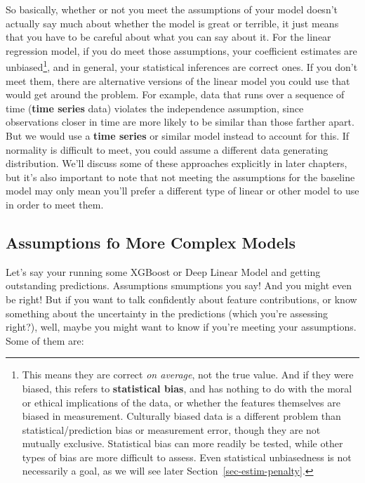 \documentclass[
  letterpaper,
]{krantz}
\begin{document}
So basically, whether or not you meet the assumptions of your model
doesn't actually say much about whether the model is great or terrible,
it just means that you have to be careful about what you can say about
it. For the linear regression model, if you do meet those assumptions,
your coefficient estimates are unbiased\footnote{This means they are
  correct \emph{on average}, not the true value. And if they were
  biased, this refers to \textbf{statistical bias}, and has nothing to
  do with the moral or ethical implications of the data, or whether the
  features themselves are biased in measurement. Culturally biased data
  is a different problem than statistical/prediction bias or measurement
  error, though they are not mutually exclusive. Statistical bias can
  more readily be tested, while other types of bias are more difficult
  to assess. Even statistical unbiasedness is not necessarily a goal, as
  we will see later Section~\ref{sec-estim-penalty}.}, and in general,
your statistical inferences are correct ones. If you don't meet them,
there are alternative versions of the linear model you could use that
would get around the problem. For example, data that runs over a
sequence of time (\textbf{time series} data) violates the independence
assumption, since observations closer in time are more likely to be
similar than those farther apart. But we would use a \textbf{time
series} or similar model instead to account for this. If normality is
difficult to meet, you could assume a different data generating
distribution. We'll discuss some of these approaches explicitly in later
chapters, but it's also important to note that not meeting the
assumptions for the baseline model may only mean you'll prefer a
different type of linear or other model to use in order to meet them.

\subsection{Assumptions fo More Complex
Models}\label{sec-lm-assumption-complex}

Let's say your running some XGBoost or Deep Linear Model and getting
outstanding predictions. Assumptions smumptions you say! And you might
even be right! But if you want to talk confidently about feature
contributions, or know something about the uncertainty in the
predictions (which you're assessing right?), well, maybe you might want
to know if you're meeting your assumptions. Some of them are:
\end{document}
